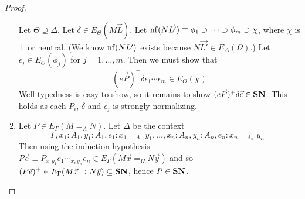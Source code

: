 \begin{proof}
\begin{enumerate}
Let $\Theta \supseteq \Delta$.  Let $\delta \in E_\Theta(M \vec{L})$.
Let $\mathrm{nf} ( {N \vec{L'}} ) \equiv \phi_1 \supset \cdots \supset \phi_m \supset \chi$,
where $\chi$ is $\bot$ or neutral.  (We know $\mathrm{nf} ( {N \vec{L'}} )$ exists because
$N \vec{L'} \in E_\Delta(\Omega)$.)  Let $\epsilon_j \in E_\Theta(\phi_j)$ for
$j = 1, \ldots, m$.  Then we must show that
\[ (e \vec{P})^+ \delta \epsilon_1 \cdots \epsilon_m \in E_\Theta(\chi) \]
Well-typedness is easy to show, so it remains to show $(e \vec{P})^+ \delta \vec{\epsilon} \in \mathbf{SN}$.  This holds as each $P_i$, $\delta$ and $\epsilon_j$ is
strongly normalizing.
\item
Let $P \in E_\Gamma(M =_A N)$.  Let $\Delta$ be the context
\[ \Gamma, x_1 : A_1, y_1 : A_1, e_1 : x_1 =_{A_1} y_1, \ldots, x_n : A_n, y_n : A_n, e_n : x_n =_{A_n} y_n \enspace \]
Then using the induction hypothesis $P \vec{e} \equiv P_{x_1 y_1} e_1 \cdots_{x_n y_n} e_n \in E_\Gamma(M \vec{x} =_\Omega N \vec{y})$ and so
$(P \vec{e})^+ \in E_\Gamma(M \vec{x} \supset N \vec{y}) \subseteq \mathbf{SN}$, hence $P \in \mathbf{SN}$.
\end{enumerate}
\end{proof}

